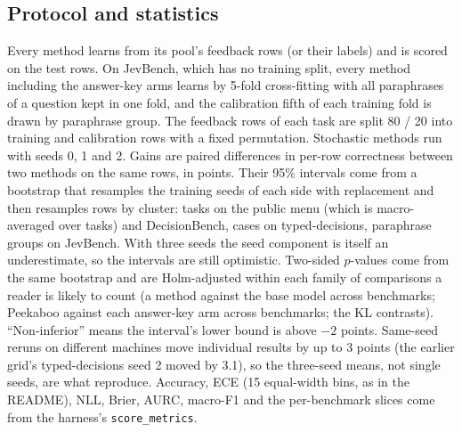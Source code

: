 \documentclass[11pt]{article}
\newcommand{\pk}{Peekaboo}
\begin{document}
\subsection{Protocol and statistics}
Every method learns from its pool's feedback rows (or their labels) and is scored on the test rows. On JevBench, which has no training split, every method including the answer-key arms learns by 5-fold cross-fitting with all paraphrases of a question kept in one fold, and the calibration fifth of each training fold is drawn by paraphrase group. The feedback rows of each task are split 80 / 20 into training and calibration rows with a fixed permutation. Stochastic methods run with seeds 0, 1 and 2. Gains are paired differences in per-row correctness between two methods on the same rows, in points. Their 95\% intervals come from a bootstrap that resamples the training seeds of each side with replacement and then resamples rows by cluster: tasks on the public menu (which is macro-averaged over tasks) and DecisionBench, cases on typed-decisions, paraphrase groups on JevBench. With three seeds the seed component is itself an underestimate, so the intervals are still optimistic. Two-sided $p$-values come from the same bootstrap and are Holm-adjusted within each family of comparisons a reader is likely to count (a method against the base model across benchmarks; \pk{} against each answer-key arm across benchmarks; the KL contrasts). ``Non-inferior'' means the interval's lower bound is above $-2$ points. Same-seed reruns on different machines move individual results by up to 3 points (the earlier grid's typed-decisions seed 2 moved by 3.1), so the three-seed means, not single seeds, are what reproduce. Accuracy, ECE (15 equal-width bins, as in the README), NLL, Brier, AURC, macro-F1 and the per-benchmark slices come from the harness's \texttt{score\_metrics}.
\end{document}
